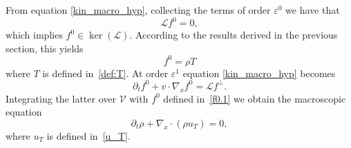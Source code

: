 \documentclass[a4paper]{article}
\theoremstyle{Theorem}\newtheorem{proposition}{Proposition}[section]
\theoremstyle{Remark}\newtheorem{remark}{Remark}[section]
\theoremstyle{Theorem}\newtheorem{theorem}{Theorem}[section]
\begin{document}
From equation \eqref{kin_macro_hyp}, collecting the terms of order $\varepsilon^0$ we have that
\[
\mathcal{L}f^0 = 0,
\]
which implies $f^0 \in \ker(\mathcal{L})$. According to the results derived in the previous section, this yields
\begin{equation}\label{f0.1}
    f^0 = \rho T
\end{equation}
where $T$ is defined in~\eqref{def:T}. At order $\varepsilon^1$ equation \eqref{kin_macro_hyp} becomes
\begin{equation}\label{macro1.eps1}
    \partial_t f^0 + v\cdot \nabla_x f^0 =\mathcal{L}f^{\bot}.
\end{equation}
Integrating the latter over $\mathcal{V}$ with $f^0$ defined in~\eqref{f0.1} we obtain the macroscopic equation
\begin{equation}\label{macro1_govern}
    \partial_t \rho +\nabla_x \cdot \left(\rho u_T\right)=0,
\end{equation}
where $u_T$ is defined in~\eqref{u_T}. 
\end{document}
